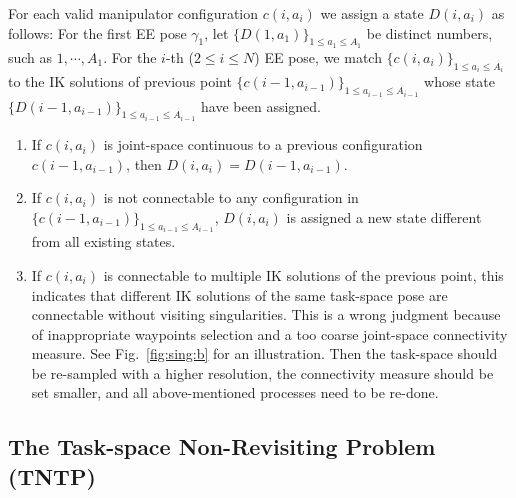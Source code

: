\documentclass[letterpaper, 10 pt, conference]{ieeeconf}  %
\begin{document}
For each valid manipulator configuration $c(i, a_i)$ we assign a state $D(i, a_i)$ as follows: 
For the first EE pose $\gamma_1$, let $\{D(1, a_1)\}_{1\leq a_1\leq A_1}$ be distinct numbers, such as $1, \cdots, A_1$. 
For the $i$-th ($2\leq i\leq N$) EE pose, we match $\{c(i, a_i)\}_{1\leq a_i\leq A_i}$ to the IK solutions of previous point $\{c(i-1, a_{i-1})\}_{1\leq a_{i-1}\leq A_{i-1}}$ whose state $\{D(i-1, a_{i-1})\}_{1\leq a_{i-1}\leq A_{i-1}}$ have been assigned. 
\begin{enumerate}
\item If $c(i, a_i)$ is joint-space continuous to a previous configuration $c(i-1, a_{i-1})$, then $D(i, a_i) = D(i-1, a_{i-1})$.
\item If $c(i, a_i)$ is not connectable to any configuration in $\{c(i-1, a_{i-1})\}_{1\leq a_{i-1}\leq A_{i-1}}$,  $D(i, a_i)$ is assigned a new state different from all existing states. 
\item If $c(i, a_i)$ is connectable to multiple IK solutions of the previous point, this indicates that different IK solutions of the same task-space pose are connectable without visiting singularities. This is a wrong judgment because of inappropriate waypoints selection and a too coarse joint-space connectivity measure. See Fig.~\ref{fig:sing:b} for an illustration. Then the task-space should be re-sampled with a higher resolution, the connectivity measure should be set smaller, and all above-mentioned processes need to be re-done. 
\end{enumerate}


\subsection{The Task-space Non-Revisiting Problem (TNTP)}
\end{document}
